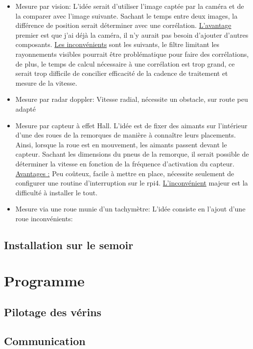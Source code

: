 \begin{itemize}
    \item Mesure par vision: L'idée serait d'utiliser l'image captée par la caméra et de la comparer avec l'image suivante. Sachant le temps entre deux images,
          la différence de position serait déterminer avec une corrélation. \underline{L'avantage} premier est que j'ai déjà la caméra, il n'y aurait pas besoin d'ajouter d'autres composants.
          \underline{Les inconvénients} sont les suivants, le filtre limitant les rayonnements visibles pourrait être problématique pour faire des corrélations, de plus, le temps de calcul nécessaire
          à une corrélation est trop grand, ce serait trop difficile de concilier efficacité de la cadence de traitement et mesure de la vitesse.
    \item Mesure par radar doppler: Vitesse radial, nécessite un obstacle, sur route peu adapté
    \item Mesure par capteur à effet Hall. L'idée est de fixer des aimants sur l'intérieur d'une des roues de la remorques de manière à connaître leurs placements.
          Ainsi, lorsque la roue est en mouvement, les aimants passent devant le capteur. Sachant les dimensions du pneus de la remorque, il serait possible de déterminer la vitesse en fonction de la fréquence d'activation du capteur.
          \underline{Avantages :} Peu coûteux, facile à mettre en place, nécessite seulement de configurer une routine d'interruption sur le \Gls{rpi4}. \underline{L'inconvénient} majeur est la difficulté à installer le tout.
    \item Mesure via une roue munie d'un tachymètre: L'idée consiste en l'ajout d'une roue
          inconvénients:
\end{itemize}

\subsection{Installation sur le semoir}

\section{Programme}
\subsection{Pilotage des vérins}
\subsection{Communication}